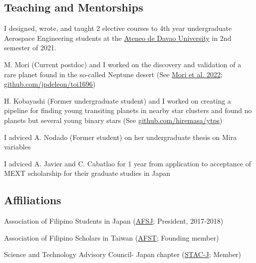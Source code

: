 \documentclass[11pt,letterpaper]{article}
\begin{document}
\subsection{Teaching and Mentorships}
\begin{list}{}{\cvlist}
    \item I designed, wrote, and taught 2 elective courses to 4th year undergraduate Aerospace Engineering students at the \href{http://sea.addu.edu.ph/programs/aerospace-engineering/}{Ateneo de Davao University} in 2nd semester of 2021. \\
    \item M. Mori (Current postdoc) and I worked on the discovery and validation of a rare planet found in the so-called Neptune desert (See \href{https://ui.adsabs.harvard.edu/abs/2022AJ....163..298M/abstract}{Mori et al. 2022}; \href{https://github.com/jpdeleon/toi1696}{github.com/jpdeleon/toi1696})
    \item H. Kobayashi (Former undergraduate student) and I worked on creating a pipeline for finding young transiting planets in nearby star clusters and found no planets but several young binary stars (See \href{https://github.com/hiremasa/ytps}{github.com/hiremasa/ytps})
    \item I adviced A. Nodado (Former student) on her undergraduate thesis on Mira variables
    \item I adviced A. Javier and C. Cabatlao for 1 year from application to acceptance of MEXT scholarship for their graduate studies in Japan
\end{list}


\subsection{Affiliations}
\begin{list}{}{\cvlist}
    \item Association of Filipino Students in Japan (\href{https://www.facebook.com/afsjpage/}{AFSJ}; President, 2017-2018)
    \item Association of Filipino Scholars in Taiwan  (\href{https://www.facebook.com/AssocIskolar/}{AFST}; Founding member)
    \item Science and Technology Advisory Council- Japan chapter (\href{https://www.facebook.com/profile.php?id=100083271798519}{STAC-J}; Member)
\end{list}
\end{document}
